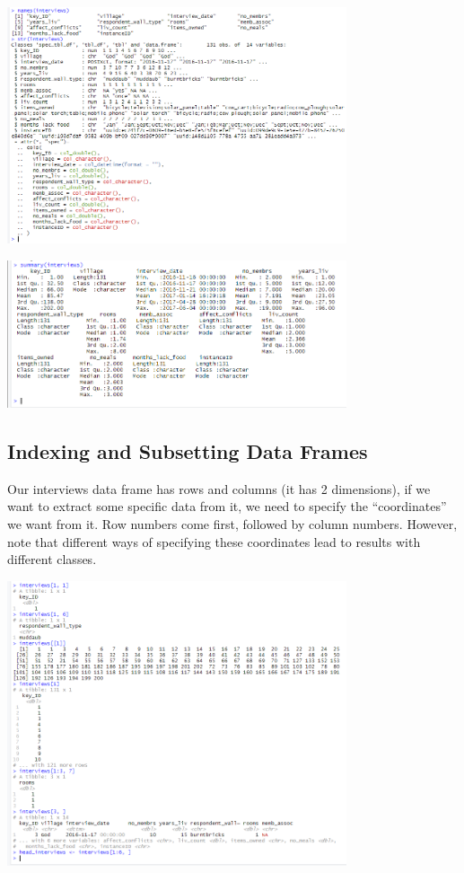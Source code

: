 \documentclass{article}
\begin{document}
\includegraphics[width=10cm]{Images/RStudio020.PNG}

\includegraphics[width=10cm]{Images/RStudio021.PNG}

\subsection{Indexing and Subsetting Data Frames}

Our interviews data frame has rows and columns (it has 2 dimensions), if we want to extract some specific data from it, we need to specify the “coordinates” we want from it. Row numbers come first, followed by column numbers. However, note that different ways of specifying these coordinates lead to results with different classes.
    
\includegraphics[width=10cm]{Images/RStudio022.PNG}
\end{document}
